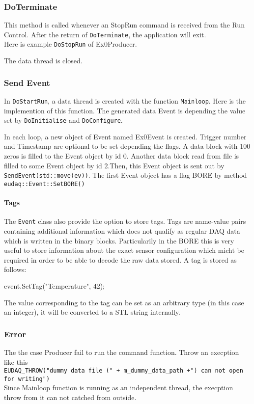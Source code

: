 \subsubsection{DoTerminate}
This method is called whenever an StopRun command is received from the Run Control. After the return of \lstinline[style=cpp]{DoTerminate}, the application will exit.\\
Here is example \lstinline[style=cpp]{DoStopRun} of Ex0Producer.

The data thread is closed. 

\subsubsection{Send Event}
In \lstinline[style=cpp]{DoStartRun}, a data thread is created with the function \lstinline[style=cpp]{Mainloop}. Here is the implemention of this function. The generated data Event is depending the value set by \lstinline[style=cpp]{DoInitialise} and \lstinline[style=cpp]{DoConfigure}.

In each loop, a new object of Event named Ex0Event is created. Trigger number and Timestamp are optional to be set depending the flags. A data block with 100 zeros is filled to the Event object by id 0. Another data block read from file is filled to some Event object by id 2.Then, this Event object is sent out by \lstinline[style=cpp]{SendEvent(std::move(ev))}. The first Event object has a flag BORE by method \lstinline[style=cpp]{eudaq::Event::SetBORE()}

\paragraph{Tags}\label{sec:Tags}
The \texttt{Event} class also provide the option to store tags.
Tags are name-value pairs containing additional information which does not qualify as regular DAQ data which is written in the binary blocks.
Particularily in the \gls{BORE} this is very useful to store information about the exact sensor configuration which micht be required in order to be able to decode the raw data stored.
A tag is stored as follows:
\begin{listing}
event.SetTag("Temperature", 42);
\end{listing}

The value corresponding to the tag can be set as an arbitrary type (in this case an integer),
it will be converted to a STL string internally.

\subsubsection{Error}\label{sec:Tags}
The the case Producer fail to run the command function. Throw an execption like this\\
\lstinline[style=cpp]{EUDAQ_THROW("dummy data file (" + m_dummy_data_path +") can not open for writing")}\\
Since Mainloop function is running as an independent thread, the execption throw from it can not catched from outside.

